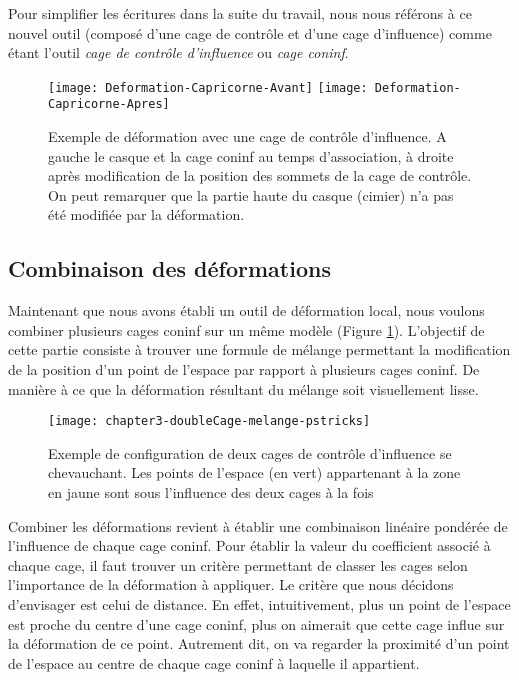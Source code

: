 Pour simplifier les écritures dans la suite du travail, nous nous référons à
ce nouvel outil (composé d'une cage de contrôle et d'une cage d'influence)
comme étant l'outil \textit{cage de contrôle d'influence} ou \textit{cage
coninf}.

\begin{figure}[ht]
  \begin{center}
    \texttt{[image: Deformation-Capricorne-Avant]}
    \texttt{[image: Deformation-Capricorne-Apres]}

    \caption[Exemple de déformation cage de contrôle d'influence] {Exemple de
déformation avec une cage de contrôle d'influence. A gauche le casque et la
cage coninf au temps d'association, à droite après modification de la position
des sommets de la cage de contrôle. On peut remarquer que la partie haute du
casque (cimier) n'a pas été modifiée par la déformation.}

  \end{center}
\end{figure}

\subsection{Combinaison des déformations}

Maintenant que nous avons établi un outil de déformation local, nous voulons
combiner plusieurs cages coninf sur un même modèle (Figure \ref{MELMC}).
L'objectif de cette partie consiste à trouver une formule de mélange
permettant la modification de la position d'un point de l'espace par rapport à
plusieurs cages coninf. De manière à ce que la déformation résultant du
mélange soit visuellement lisse.

\begin{figure}[ht]
  \begin{center}
    \texttt{[image: chapter3-doubleCage-melange-pstricks]}

    \caption[Mélange de cages de contrôle d'influence] {Exemple de
configuration de deux cages de contrôle d'influence se chevauchant. Les points
de l'espace (en vert) appartenant à la zone en jaune sont sous l'influence des
deux cages à la fois}

    \label{MELMC}
  \end{center}
\end{figure}

Combiner les déformations revient à établir une combinaison linéaire pondérée
de l'influence de chaque cage coninf. Pour établir la valeur du coefficient
associé à chaque cage, il faut trouver un critère permettant de classer les
cages selon l'importance de la déformation à appliquer. Le critère que nous
décidons d'envisager est celui de distance. En effet, intuitivement, plus
un point de l'espace est proche du centre d'une cage coninf, plus on aimerait
que cette cage influe sur la déformation de ce point. Autrement dit, on va
regarder la proximité d'un point de l'espace au centre de chaque cage coninf à
laquelle il appartient.

